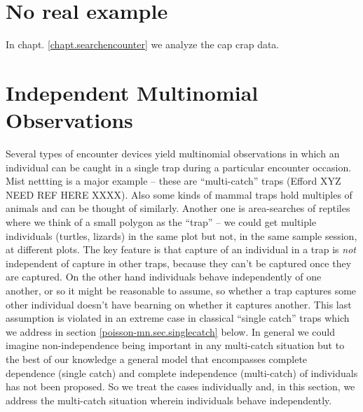 {

\section{No real example}

In chapt. \ref{chapt.searchencounter} we analyze the cap crap data.


\section{Independent Multinomial Observations}

Several types of encounter devices yield multinomial observations in
which an individual can be caught in a single trap during a particular
encounter occasion.  Mist nettting is a major example -- these are
``multi-catch'' traps (Efford XYZ NEED REF HERE XXXX). Also some kinds of
mammal traps hold multiples of animals and can be thought of
similarly. Another one is area-searches of reptiles where we think of
a small polygon as the ``trap'' -- we could get multiple individuals
(turtles, lizards) in the same plot but not, in the same sample
session, at different plots.  The key feature is that capture of an
individual in a trap is {\it not} independent of capture in other
traps, because they can't be captured once they are captured. On the
other hand individuals behave independently of one another, or so it
might be reasonable to assume, so whether a trap captures some other
individual doesn't have bearning on whether it captures another.  This
last assumption is violated in an extreme case in classical ``single
catch'' traps which we address in section \ref{poisson-mn.sec.singlecatch}
below. In general we could imagine non-independence being important in
any multi-catch situation but to the best of our knowledge a general
model that encompasses complete dependence (single catch) and complete
independence (multi-catch) of individuals has not been proposed.  So
we treat the cases individually and, in this section, we address the
multi-catch situation wherein individuals behave independently.


}
